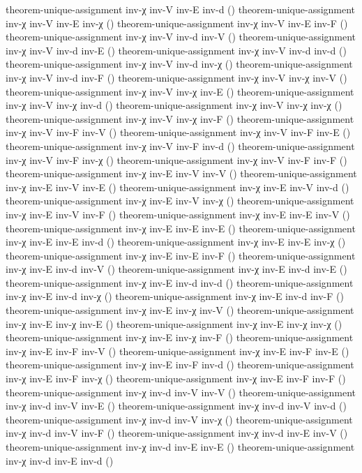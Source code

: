 \documentclass[11pt,a4paper]{article}
\begin{document}
\begin{code}
theorem-unique-assignment inv-χ inv-V inv-E inv-d ()
theorem-unique-assignment inv-χ inv-V inv-E inv-χ ()
theorem-unique-assignment inv-χ inv-V inv-E inv-F ()
theorem-unique-assignment inv-χ inv-V inv-d inv-V ()
theorem-unique-assignment inv-χ inv-V inv-d inv-E ()
theorem-unique-assignment inv-χ inv-V inv-d inv-d ()
theorem-unique-assignment inv-χ inv-V inv-d inv-χ ()
theorem-unique-assignment inv-χ inv-V inv-d inv-F ()
theorem-unique-assignment inv-χ inv-V inv-χ inv-V ()
theorem-unique-assignment inv-χ inv-V inv-χ inv-E ()
theorem-unique-assignment inv-χ inv-V inv-χ inv-d ()
theorem-unique-assignment inv-χ inv-V inv-χ inv-χ ()
theorem-unique-assignment inv-χ inv-V inv-χ inv-F ()
theorem-unique-assignment inv-χ inv-V inv-F inv-V ()
theorem-unique-assignment inv-χ inv-V inv-F inv-E ()
theorem-unique-assignment inv-χ inv-V inv-F inv-d ()
theorem-unique-assignment inv-χ inv-V inv-F inv-χ ()
theorem-unique-assignment inv-χ inv-V inv-F inv-F ()
theorem-unique-assignment inv-χ inv-E inv-V inv-V ()
theorem-unique-assignment inv-χ inv-E inv-V inv-E ()
theorem-unique-assignment inv-χ inv-E inv-V inv-d ()
theorem-unique-assignment inv-χ inv-E inv-V inv-χ ()
theorem-unique-assignment inv-χ inv-E inv-V inv-F ()
theorem-unique-assignment inv-χ inv-E inv-E inv-V ()
theorem-unique-assignment inv-χ inv-E inv-E inv-E ()
theorem-unique-assignment inv-χ inv-E inv-E inv-d ()
theorem-unique-assignment inv-χ inv-E inv-E inv-χ ()
theorem-unique-assignment inv-χ inv-E inv-E inv-F ()
theorem-unique-assignment inv-χ inv-E inv-d inv-V ()
theorem-unique-assignment inv-χ inv-E inv-d inv-E ()
theorem-unique-assignment inv-χ inv-E inv-d inv-d ()
theorem-unique-assignment inv-χ inv-E inv-d inv-χ ()
theorem-unique-assignment inv-χ inv-E inv-d inv-F ()
theorem-unique-assignment inv-χ inv-E inv-χ inv-V ()
theorem-unique-assignment inv-χ inv-E inv-χ inv-E ()
theorem-unique-assignment inv-χ inv-E inv-χ inv-χ ()
theorem-unique-assignment inv-χ inv-E inv-χ inv-F ()
theorem-unique-assignment inv-χ inv-E inv-F inv-V ()
theorem-unique-assignment inv-χ inv-E inv-F inv-E ()
theorem-unique-assignment inv-χ inv-E inv-F inv-d ()
theorem-unique-assignment inv-χ inv-E inv-F inv-χ ()
theorem-unique-assignment inv-χ inv-E inv-F inv-F ()
theorem-unique-assignment inv-χ inv-d inv-V inv-V ()
theorem-unique-assignment inv-χ inv-d inv-V inv-E ()
theorem-unique-assignment inv-χ inv-d inv-V inv-d ()
theorem-unique-assignment inv-χ inv-d inv-V inv-χ ()
theorem-unique-assignment inv-χ inv-d inv-V inv-F ()
theorem-unique-assignment inv-χ inv-d inv-E inv-V ()
theorem-unique-assignment inv-χ inv-d inv-E inv-E ()
theorem-unique-assignment inv-χ inv-d inv-E inv-d ()

\end{code}
\end{document}
